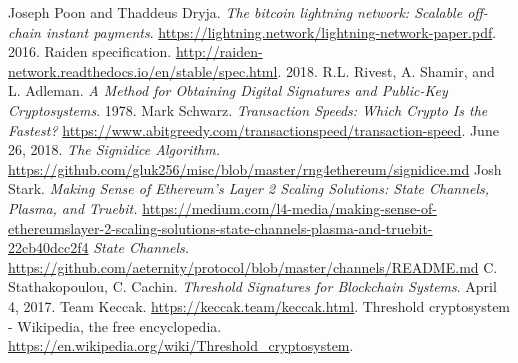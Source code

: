 \documentclass[tikz, 12pt]{article}
\theoremstyle{definition}
\theoremstyle{remark}
\begin{document}
\begin{thebibliography}{9}
 Joseph Poon and Thaddeus Dryja. \emph{The bitcoin lightning network: Scalable off-chain instant payments}. \url{https://lightning.network/lightning-network-paper.pdf}. 2016.
 Raiden specification. \url{http://raiden-network.readthedocs.io/en/stable/spec.html}. 2018.
 R.L. Rivest, A. Shamir, and L. Adleman. \emph{A Method for Obtaining Digital Signatures and Public-Key Cryptosystems}. 1978.
 Mark Schwarz. \emph{Transaction Speeds: Which Crypto Is the Fastest?} \url{https://www.abitgreedy.com/transactionspeed/transaction-speed}. June 26, 2018.
 \emph{The Signidice Algorithm.} \url{https://github.com/gluk256/misc/blob/master/rng4ethereum/signidice.md}
 Josh Stark. \emph{Making Sense of Ethereum’s Layer 2 Scaling Solutions: State Channels, Plasma, and Truebit.} \url{https://medium.com/l4-media/making-sense-of-ethereumslayer-2-scaling-solutions-state-channels-plasma-and-truebit-22cb40dcc2f4}
 \emph{State Channels.} \url{https://github.com/aeternity/protocol/blob/master/channels/README.md}
 C. Stathakopoulou, C. Cachin. \emph{Threshold Signatures for Blockchain Systems}. April 4, 2017. 
 Team Keccak. \url{https://keccak.team/keccak.html}.
 Threshold cryptosystem - Wikipedia, the free encyclopedia. \url{https://en.wikipedia.org/wiki/Threshold_cryptosystem}.
\end{thebibliography}


		
\end{document}
